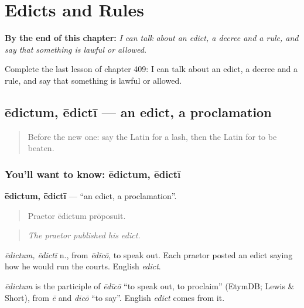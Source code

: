 
\chapter{Edicts and Rules}
\label{ch:la-edicts-and-rules}

\begin{chapteropening}
\textbf{By the end of this chapter:} \emph{I can talk about an edict, a decree and a rule, and say that something is lawful or allowed.}

Complete the last lesson of chapter 409: I can talk about an edict, a decree and a rule, and say that something is lawful or allowed.
\end{chapteropening}

\section[ēdictum, ēdictī]{ēdictum, ēdictī — an edict, a proclamation}

\label{lesson:LA-C409-edictum}



\begin{quote}
Before the new one: say the Latin for a lash, then the Latin for to be beaten.
\end{quote}

\subsection*{You'll want to know: ēdictum, ēdictī}
\textbf{ēdictum, ēdictī} — \textquotedblleft{}an edict, a proclamation\textquotedblright{}.

\begin{quote}
Praetor ēdictum prōposuit.
\end{quote}

\begin{quote}
\emph{The praetor published his edict.}
\end{quote}

\emph{ēdictum, ēdictī} n., from \emph{ēdīcō}, to speak out. Each praetor posted an edict saying how he would run the courts. English \emph{edict}.

\begin{cousinweb}
\emph{ēdictum} is the participle of \emph{ēdīcō} \textquotedblleft{}to speak out, to proclaim\textquotedblright{} (EtymDB; Lewis \& Short), from \emph{ē} and \emph{dīcō} \textquotedblleft{}to say\textquotedblright{}. English \emph{edict} comes from it.
\end{cousinweb}

